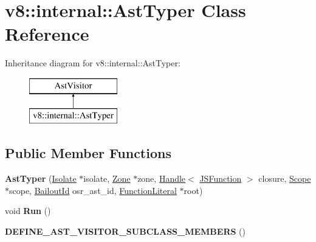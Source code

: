 \hypertarget{classv8_1_1internal_1_1_ast_typer}{}\section{v8\+:\+:internal\+:\+:Ast\+Typer Class Reference}
\label{classv8_1_1internal_1_1_ast_typer}
Inheritance diagram for v8\+:\+:internal\+:\+:Ast\+Typer\+:\begin{figure}[H]
\begin{center}
\leavevmode
\includegraphics[height=2.000000cm]{classv8_1_1internal_1_1_ast_typer}
\end{center}
\end{figure}
\subsection*{Public Member Functions}
\begin{DoxyCompactItemize}
\item 
{\bfseries Ast\+Typer} (\hyperlink{classv8_1_1internal_1_1_isolate}{Isolate} $\ast$isolate, \hyperlink{classv8_1_1internal_1_1_zone}{Zone} $\ast$zone, \hyperlink{classv8_1_1internal_1_1_handle}{Handle}$<$ \hyperlink{classv8_1_1internal_1_1_j_s_function}{J\+S\+Function} $>$ closure, \hyperlink{classv8_1_1internal_1_1_scope}{Scope} $\ast$scope, \hyperlink{classv8_1_1internal_1_1_bailout_id}{Bailout\+Id} osr\+\_\+ast\+\_\+id, \hyperlink{classv8_1_1internal_1_1_function_literal}{Function\+Literal} $\ast$root)\hypertarget{classv8_1_1internal_1_1_ast_typer_ac90d3cb3751ecbb87df215ed2acdbee4}{}\label{classv8_1_1internal_1_1_ast_typer_ac90d3cb3751ecbb87df215ed2acdbee4}

\item 
void {\bfseries Run} ()\hypertarget{classv8_1_1internal_1_1_ast_typer_a768476a3bb2123cb3a238445a0614101}{}\label{classv8_1_1internal_1_1_ast_typer_a768476a3bb2123cb3a238445a0614101}

\item 
{\bfseries D\+E\+F\+I\+N\+E\+\_\+\+A\+S\+T\+\_\+\+V\+I\+S\+I\+T\+O\+R\+\_\+\+S\+U\+B\+C\+L\+A\+S\+S\+\_\+\+M\+E\+M\+B\+E\+RS} ()\hypertarget{classv8_1_1internal_1_1_ast_typer_a911921c74252f2efa0cc6c0120706767}{}\label{classv8_1_1internal_1_1_ast_typer_a911921c74252f2efa0cc6c0120706767}

\end{DoxyCompactItemize}
